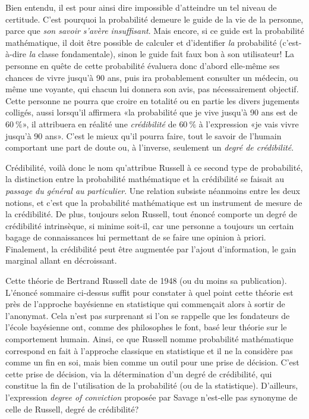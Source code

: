 Bien entendu, il est pour ainsi dire impossible d'atteindre un tel
niveau de certitude. C'est pourquoi la probabilité demeure le guide de
la vie de la personne, parce que \emph{son savoir s'avère
  insuffisant}. Mais encore, si ce guide est la probabilité
mathématique, il doit être possible de calculer et d'identifier
\emph{la} probabilité (c'est-à-dire \emph{la} classe fondamentale),
sinon le guide fait faux bon à son utilisateur! La personne en quête
de cette probabilité évaluera donc d'abord elle-même ses chances de
vivre jusqu'à 90 ans, puis ira probablement consulter un médecin, ou
même une voyante, qui chacun lui donnera son avis, pas nécessairement
objectif. Cette personne ne pourra que croire en totalité ou en partie
les divers jugements colligés, aussi lorsqu'il affirmera «la
probabilité que je vive jusqu'à 90 ans est de $60~\%$», il attribuera
en réalité une \emph{crédibilité} de $60~\%$ à l'expression «je vais
vivre jusqu'à 90 ans». C'est le mieux qu'il pourra faire, tout le
savoir de l'humain comportant une part de doute ou, à
l'inverse, seulement un \emph{degré de crédibilité}.

Crédibilité, voilà donc le nom qu'attribue Russell à ce second type de
probabilité, la distinction entre la probabilité mathématique et la
crédibilité se faisait au \emph{passage du général au particulier}.
Une relation subsiste néanmoins entre les deux notions, et c'est que
la probabilité mathématique est un instrument de mesure de la
crédibilité. De plus, toujours selon Russell, tout énoncé comporte un
degré de crédibilité intrinsèque, si minime soit-il, car une personne
a toujours un certain bagage de connaissances lui permettant de se
faire une opinion à priori. Finalement, la crédibilité peut être
augmentée par l'ajout d'information, le gain marginal allant en
décroissant.

Cette théorie de Bertrand Russell date de 1948 (ou du moins sa
publication). L'énoncé sommaire ci-dessus suffit pour constater à quel
point cette théorie est près de l'approche bayésienne en statistique
qui commençait alors à sortir de l'anonymat. Cela n'est pas surprenant
si l'on se rappelle que les fondateurs de l'école bayésienne ont,
comme des philosophes le font, basé leur théorie sur le comportement
humain. Ainsi, ce que Russell nomme probabilité mathématique correspond
en fait à l'approche classique en statistique et il ne la considère
pas comme un fin en soi, mais bien comme un outil pour une prise de
décision. C'est cette prise de décision, via la détermination d'un
degré de crédibilité, qui constitue la fin de l'utilisation de la
probabilité (ou de la statistique). D'ailleurs, l'expression
\emph{degree of conviction} proposée par Savage n'est-elle pas
synonyme de celle de Russell, degré de crédibilité?

